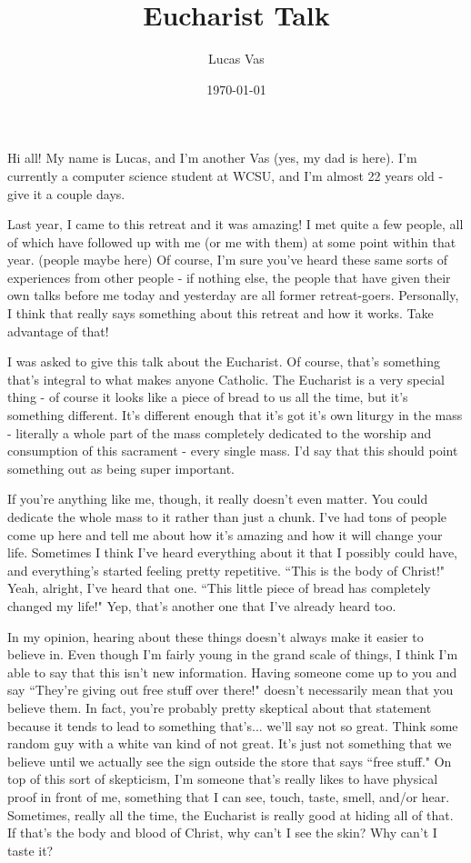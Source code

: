 \documentclass[12pt]{article}
\title{Eucharist Talk}
\author{Lucas Vas}
\date{\today}
\begin{document}
  \maketitle
  \clearpage

    Hi all! My name is Lucas, and I'm another Vas (yes, my dad is here). I'm currently a computer science student
    at WCSU, and I'm almost 22 years old - give it a couple days.

    Last year, I came to this retreat and it was amazing! I met quite a few people, all of which have followed up
    with me (or me with them) at some point within that year. (people maybe here) Of course, I'm sure you've heard
    these same sorts of experiences from other people - if nothing else, the people that have given their own talks
    before me today and yesterday are all former retreat-goers. Personally, I think that really says something about
    this retreat and how it works. Take advantage of that!

    I was asked to give this talk about the Eucharist. Of course, that's something that's integral to what makes
    anyone Catholic. The Eucharist is a very special thing - of course it looks like a piece of bread to us all
    the time, but it's something different. It's different enough that it's got it's own liturgy in the mass - literally
    a whole part of the mass completely dedicated to the worship and consumption of this sacrament - every single mass.
    I'd say that this should point something out as being super important.

    If you're anything like me, though, it really doesn't even matter. You could dedicate the whole mass to it rather
    than just a chunk. I've had tons of people come up here and tell me about how it's amazing and how it will change
    your life. Sometimes I think I've heard everything about it that I possibly could have, and everything's started
    feeling pretty repetitive. ``This is the body of Christ!" Yeah, alright, I've heard that one. ``This little
    piece of bread has completely changed my life!" Yep, that's another one that I've already heard too.

    In my opinion, hearing about these things doesn't always make it easier to believe in. Even though I'm fairly young in the grand
    scale of things, I think I'm able to say that this isn't new information. Having someone come up to you and say
    ``They're giving out free stuff over there!" doesn't necessarily mean that you believe them. In fact, you're
    probably pretty skeptical about that statement because it tends to lead to something that's... we'll say not so
    great. Think some random guy with a white van kind of not great. It's just not something that we believe until
    we actually see the sign outside the store that says ``free stuff." On top of this sort of skepticism, I'm someone
    that's really likes to have physical proof in front of me, something that I can see, touch, taste, smell, and/or
    hear. Sometimes, really all the time, the Eucharist is really good at hiding all of that. If that's the body and
    blood of Christ, why can't I see the skin? Why can't I taste it?
\end{document}
